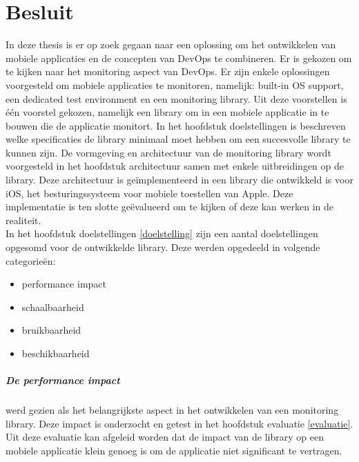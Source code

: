 \chapter{Besluit}
\label{besluit}


In deze thesis is er op zoek gegaan naar een oplossing om het ontwikkelen van mobiele applicaties en de concepten van DevOps te combineren. Er is gekozen om te kijken naar het monitoring aspect van DevOps. Er zijn enkele oplossingen voorgesteld om mobiele applicaties te monitoren, namelijk: built-in OS support, een dedicated test environment en een monitoring library. Uit deze voorstellen is \'e\'en voorstel gekozen, namelijk een library om in een mobiele applicatie in te bouwen die de applicatie monitort. In het hoofdstuk doelstellingen is beschreven welke specificaties de library minimaal moet hebben om een succesvolle library te kunnen zijn. De vormgeving en architectuur van de monitoring library wordt voorgesteld in het hoofdstuk architectuur samen met enkele uitbreidingen op de library. Deze architectuur is ge\"implementeerd in een library die ontwikkeld is voor iOS, het besturingssysteem voor mobiele toestellen van Apple. Deze implementatie is ten slotte ge\"evalueerd om te kijken of deze kan werken in de realiteit. \\


In het hoofdstuk doelstellingen \ref{doelstelling} zijn een aantal doelstellingen opgesomd voor de ontwikkelde library. Deze werden opgedeeld in volgende categorie\"en: 
\begin{itemize}
\item performance impact
\item schaalbaarheid
\item bruikbaarheid
\item beschikbaarheid
\end{itemize}

\paragraph{De performance impact} werd gezien als het belangrijkste aspect in het ontwikkelen van een monitoring library. Deze impact is onderzocht en getest in het hoofdstuk evaluatie \ref{evaluatie}. Uit deze evaluatie kan afgeleid worden dat de impact van de library op een mobiele applicatie klein genoeg is om de applicatie niet significant te vertragen. \\


